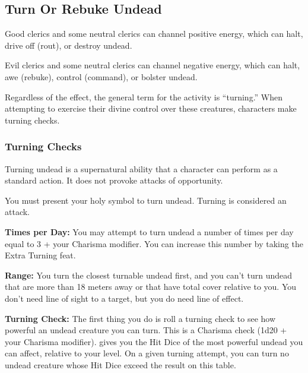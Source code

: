 \subsection{Turn Or Rebuke Undead}
Good clerics and some neutral clerics can channel positive energy, which can halt, drive off (rout), or destroy undead.

Evil clerics and some neutral clerics can channel negative energy, which can halt, awe (rebuke), control (command), or bolster undead.

Regardless of the effect, the general term for the activity is ``turning.'' When attempting to exercise their divine control over these creatures, characters make turning checks.


\subsubsection{Turning Checks}
Turning undead is a supernatural ability that a character can perform as a standard action. It does not provoke attacks of opportunity.

You must present your holy symbol to turn undead. Turning is considered an attack.

\textbf{Times per Day:} You may attempt to turn undead a number of times per day equal to 3 + your Charisma modifier. You can increase this number by taking the Extra Turning feat.

\textbf{Range:} You turn the closest turnable undead first, and you can't turn undead that are more than 18 meters away or that have total cover relative to you. You don't need line of sight to a target, but you do need line of effect.

\textbf{Turning Check:} The first thing you do is roll a turning check to see how powerful an undead creature you can turn. This is a Charisma check (1d20 + your Charisma modifier).  gives you the Hit Dice of the most powerful undead you can affect, relative to your level. On a given turning attempt, you can turn no undead creature whose Hit Dice exceed the result on this table.

